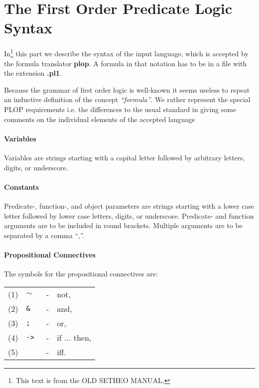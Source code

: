 %
\section{The First Order Predicate Logic Syntax}\label{sec:pl1-syntax}

In\footnote{This text is from the OLD SETHEO MANUAL.}
 this part we describe the syntax of the input language, which is
accepted by the formula translator {\bf plop}.
A formula in that notation has to be in a file with the extension {\bf .pl1}.

Because the grammar of first order logic is well-known it seems
useless to repeat an inductive definition of the concept 
{\em ``formula''}. We rather represent the special PLOP
requirements i.e. the differences to the usual
standard in giving some comments on the individual
elements of the accepted language

\paragraph{Variables}
Variables are strings starting with a capital letter followed 
by arbitrary letters, digits, or underscore.

\paragraph{Constants}
Predicate-, function-, and object parameters are strings starting 
with a lower case letter followed by lower case letters, digits, or underscore. 
Predicate- and function arguments are to be included in round brackets.
Multiple arguments are to be separated by a comma ``,''.

\paragraph{Propositional Connectives}
The symbols for the propositional connectives are:

\begin{center}
\begin{tabular}{llll}
(1) &  {\tt $\sim$}  &   - &  not, \\
(2)  &	 {\tt \& } & -  & and, \\
(3)   &{\tt ; } & -  & or, \\
(4)   &{\tt -> } & -  & if ... then, \\
(5) & 	 {\tt <->}  & -  & iff. 
\end{tabular}                  
\end{center}

